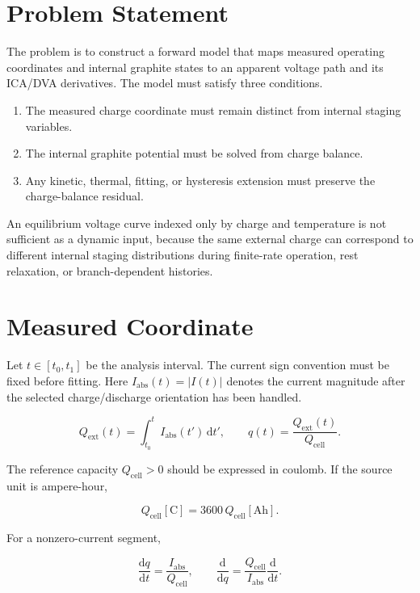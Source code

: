 \documentclass[11pt,a4paper]{article}
\newcommand{\dd}{\mathrm{d}}
\newcommand{\ext}{\mathrm{ext}}
\newcommand{\cell}{\mathrm{cell}}
\newcommand{\absI}{I_{\mathrm{abs}}}
\begin{document}
\section{Problem Statement}

The problem is to construct a forward model that maps measured operating coordinates and internal graphite states to an apparent voltage path and its ICA/DVA derivatives. The model must satisfy three conditions.

\begin{enumerate}[label=\arabic*.]
\item The measured charge coordinate must remain distinct from internal staging variables.
\item The internal graphite potential must be solved from charge balance.
\item Any kinetic, thermal, fitting, or hysteresis extension must preserve the charge-balance residual.
\end{enumerate}

An equilibrium voltage curve indexed only by charge and temperature is not sufficient as a dynamic input, because the same external charge can correspond to different internal staging distributions during finite-rate operation, rest relaxation, or branch-dependent histories.

\section{Measured Coordinate}

Let \(t\in[t_0,t_1]\) be the analysis interval. The current sign convention must be fixed before fitting. Here \(\absI(t)=|I(t)|\) denotes the current magnitude after the selected charge/discharge orientation has been handled.

\begin{equation}
Q_{\ext}(t)=\int_{t_0}^{t}\absI(t')\,\dd t',
\qquad
q(t)=\frac{Q_{\ext}(t)}{Q_{\cell}}.
\label{eq:q_coordinate}
\end{equation}

The reference capacity \(Q_{\cell}>0\) should be expressed in coulomb. If the source unit is ampere-hour,

\begin{equation}
Q_{\cell}[\mathrm{C}]=3600\,Q_{\cell}[\mathrm{Ah}].
\label{eq:capacity_conversion}
\end{equation}

For a nonzero-current segment,

\begin{equation}
\frac{\dd q}{\dd t}=\frac{\absI}{Q_{\cell}},
\qquad
\frac{\dd}{\dd q}=
\frac{Q_{\cell}}{\absI}\frac{\dd}{\dd t}.
\label{eq:q_time_conversion}
\end{equation}
\end{document}

